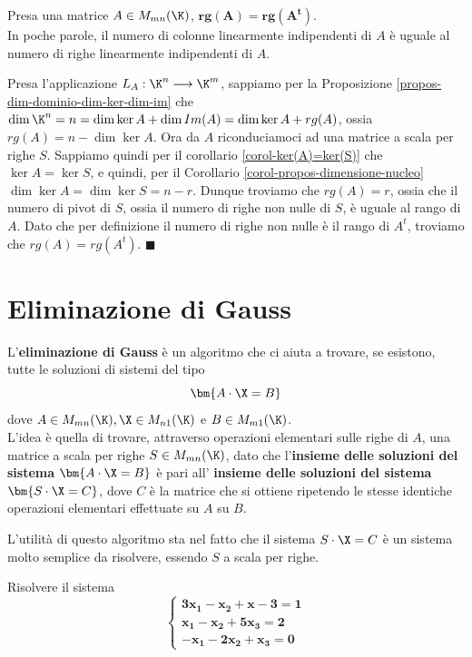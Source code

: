 \documentclass[11pt, a4paper, titlepage, oneside]{scrbook}
\begin{document}
\begin{Proposizione}[]
\label{propos-rango-uguale-trasposta}
Presa una matrice $A \in M_{mn}(\K)$, $\bm{rg(A) = rg(A^t)}$. \\
In poche parole, il numero di colonne linearmente indipendenti di $A$ è uguale al numero di righe linearmente indipendenti di $A$.
\end{Proposizione}

\Dimostrazione \nopagebreak

Presa l'applicazione $L_A: \K^n \longrightarrow \K^m$, sappiamo per la Proposizione \ref{propos-dim-dominio-dim-ker-dim-im} che $\dim \K^n = n = \dim \ker A + \dim Im(A) = \dim \ker A + rg(A)$, ossia $rg(A) = n - \dim \ker A$. Ora da $A$ riconduciamoci ad una matrice a scala per righe $S$. Sappiamo quindi per il corollario \ref{corol-ker(A)=ker(S)} che $\ker A = \ker S$, e quindi, per il Corollario \ref{corol-propos-dimensione-nucleo} $\dim \ker A = \dim \ker S = n -r$. Dunque troviamo che $rg(A) = r$, ossia che il numero di pivot di $S$, ossia il numero di righe non nulle di $S$, è uguale al rango di $A$. Dato che per definizione il numero di righe non nulle è il rango di $A^t$, troviamo che $rg(A) = rg(A^t)$. $\blacksquare$ 

\section{Eliminazione di Gauss}

\begin{Definizione}
\label{def-elim-di-gauss}
L'\textbf{eliminazione di Gauss} è un algoritmo che ci aiuta a trovare, se esistono, tutte le soluzioni di sistemi del tipo 
\[\bm{A \cdot \X = B}\]
dove $A \in M_{mn}(\K), \X \in M_{n1}(\K)$ e $B \in M_{m1}(\K)$. \\
L'idea è quella di trovare, attraverso operazioni elementari sulle righe di $A$, una matrice a scala per righe $S \in M_{mn}(\K)$, dato che l'\textbf{insieme delle soluzioni del sistema} $\bm{A \cdot \X = B}$ è pari all' \textbf{insieme delle soluzioni del sistema} $\bm{S \cdot \X = C}$, dove $C$ è la matrice che si ottiene ripetendo le stesse identiche operazioni elementari effettuate su $A$ su $B$.
\end{Definizione}
L'utilità di questo algoritmo sta nel fatto che il sistema $S \cdot \X = C$ è un sistema molto semplice da risolvere, essendo $S$ a scala per righe.

\Esempio \nopagebreak

Risolvere il sistema \nopagebreak
\[
\begin{cases}
\bm{3x_1 - x_2 + x-3= 1} \\
\bm{x_1 - x_2 + 5x_3= 2} \\
\bm{-x_1 - 2x_2 + x_3= 0}
\end{cases}
\]
\end{document}
